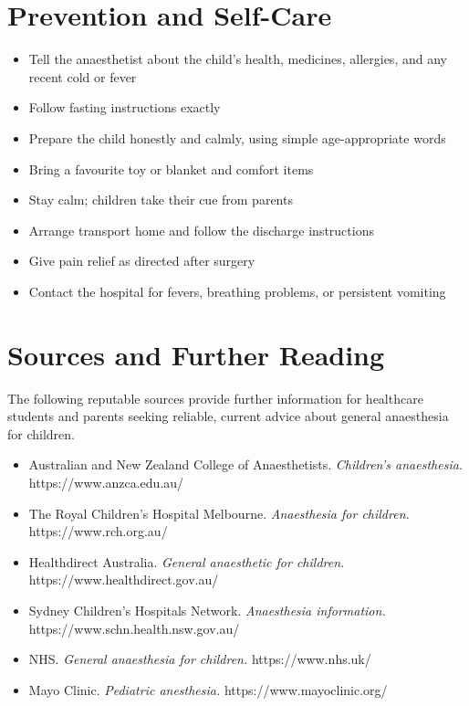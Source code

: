 \section*{Prevention and Self-Care}
\begin{itemize}
    \item Tell the anaesthetist about the child's health, medicines, allergies, and any recent cold or fever
    \item Follow fasting instructions exactly
    \item Prepare the child honestly and calmly, using simple age-appropriate words
    \item Bring a favourite toy or blanket and comfort items
    \item Stay calm; children take their cue from parents
    \item Arrange transport home and follow the discharge instructions
    \item Give pain relief as directed after surgery
    \item Contact the hospital for fevers, breathing problems, or persistent vomiting
\end{itemize}

\section*{Sources and Further Reading}
The following reputable sources provide further information for healthcare students and parents seeking reliable, current advice about general anaesthesia for children.
\begin{itemize}
    \item Australian and New Zealand College of Anaesthetists. \textit{Children's anaesthesia.} https://www.anzca.edu.au/
    \item The Royal Children's Hospital Melbourne. \textit{Anaesthesia for children.} https://www.rch.org.au/
    \item Healthdirect Australia. \textit{General anaesthetic for children.} https://www.healthdirect.gov.au/
    \item Sydney Children's Hospitals Network. \textit{Anaesthesia information.} https://www.schn.health.nsw.gov.au/
    \item NHS. \textit{General anaesthesia for children.} https://www.nhs.uk/
    \item Mayo Clinic. \textit{Pediatric anesthesia.} https://www.mayoclinic.org/
\end{itemize}
